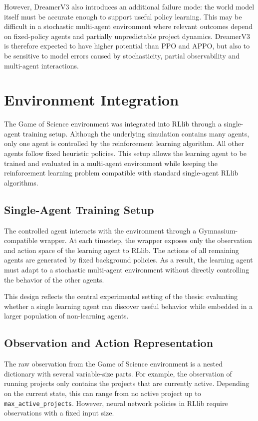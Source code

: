 \documentclass[english,bachelor]{hsluthesis}
\begin{document}
However, DreamerV3 also introduces an additional failure mode: the world model itself must be accurate enough to support useful policy learning. This may be difficult in a stochastic multi-agent environment where relevant outcomes depend on fixed-policy agents and partially unpredictable project dynamics. DreamerV3 is therefore expected to have higher potential than PPO and APPO, but also to be sensitive to model errors caused by stochasticity, partial observability and multi-agent interactions.

\section{Environment Integration}

The Game of Science environment was integrated into RLlib through a single-agent training setup. Although the underlying simulation contains many agents, only one agent is controlled by the reinforcement learning algorithm. All other agents follow fixed heuristic policies. This setup allows the learning agent to be trained and evaluated in a multi-agent environment while keeping the reinforcement learning problem compatible with standard single-agent RLlib algorithms.

\subsection{Single-Agent Training Setup}

The controlled agent interacts with the environment through a Gymnasium-compatible wrapper. At each timestep, the wrapper exposes only the observation and action space of the learning agent to RLlib. The actions of all remaining agents are generated by fixed background policies. As a result, the learning agent must adapt to a stochastic multi-agent environment without directly controlling the behavior of the other agents.

This design reflects the central experimental setting of the thesis: evaluating whether a single learning agent can discover useful behavior while embedded in a larger population of non-learning agents.

\subsection{Observation and Action Representation}

The raw observation from the Game of Science environment is a nested dictionary with several variable-size parts. For example, the observation of running projects only contains the projects that are currently active. Depending on the current state, this can range from no active project up to \texttt{max\_active\_projects}. However, neural network policies in RLlib require observations with a fixed input size.
\end{document}
